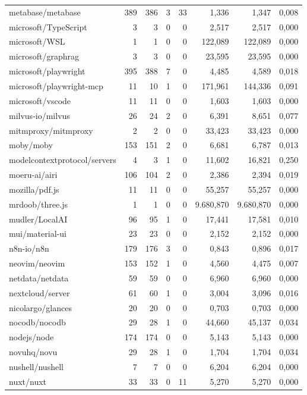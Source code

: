 \begin{tabular}{lrrrrrrr}
metabase/metabase & 389 & 386 & 3 & 33 & 1,336 & 1,347 & 0,008 \\
microsoft/TypeScript & 3 & 3 & 0 & 0 & 2,517 & 2,517 & 0,000 \\
microsoft/WSL & 1 & 1 & 0 & 0 & 122,089 & 122,089 & 0,000 \\
microsoft/graphrag & 3 & 3 & 0 & 0 & 23,595 & 23,595 & 0,000 \\
microsoft/playwright & 395 & 388 & 7 & 0 & 4,485 & 4,589 & 0,018 \\
microsoft/playwright-mcp & 11 & 10 & 1 & 0 & 171,961 & 144,336 & 0,091 \\
microsoft/vscode & 11 & 11 & 0 & 0 & 1,603 & 1,603 & 0,000 \\
milvus-io/milvus & 26 & 24 & 2 & 0 & 6,391 & 8,651 & 0,077 \\
mitmproxy/mitmproxy & 2 & 2 & 0 & 0 & 33,423 & 33,423 & 0,000 \\
moby/moby & 153 & 151 & 2 & 0 & 6,681 & 6,787 & 0,013 \\
modelcontextprotocol/servers & 4 & 3 & 1 & 0 & 11,602 & 16,821 & 0,250 \\
moeru-ai/airi & 106 & 104 & 2 & 0 & 2,386 & 2,394 & 0,019 \\
mozilla/pdf.js & 11 & 11 & 0 & 0 & 55,257 & 55,257 & 0,000 \\
mrdoob/three.js & 1 & 1 & 0 & 0 & 9.680,870 & 9.680,870 & 0,000 \\
mudler/LocalAI & 96 & 95 & 1 & 0 & 17,441 & 17,581 & 0,010 \\
mui/material-ui & 23 & 23 & 0 & 0 & 2,152 & 2,152 & 0,000 \\
n8n-io/n8n & 179 & 176 & 3 & 0 & 0,843 & 0,896 & 0,017 \\
neovim/neovim & 153 & 152 & 1 & 0 & 4,560 & 4,475 & 0,007 \\
netdata/netdata & 59 & 59 & 0 & 0 & 6,960 & 6,960 & 0,000 \\
nextcloud/server & 61 & 60 & 1 & 0 & 3,004 & 3,096 & 0,016 \\
nicolargo/glances & 20 & 20 & 0 & 0 & 0,703 & 0,703 & 0,000 \\
nocodb/nocodb & 29 & 28 & 1 & 0 & 44,660 & 45,137 & 0,034 \\
nodejs/node & 174 & 174 & 0 & 0 & 5,143 & 5,143 & 0,000 \\
novuhq/novu & 29 & 28 & 1 & 0 & 1,704 & 1,704 & 0,034 \\
nushell/nushell & 7 & 7 & 0 & 0 & 6,204 & 6,204 & 0,000 \\
nuxt/nuxt & 33 & 33 & 0 & 11 & 5,270 & 5,270 & 0,000 \\

\end{tabular}
